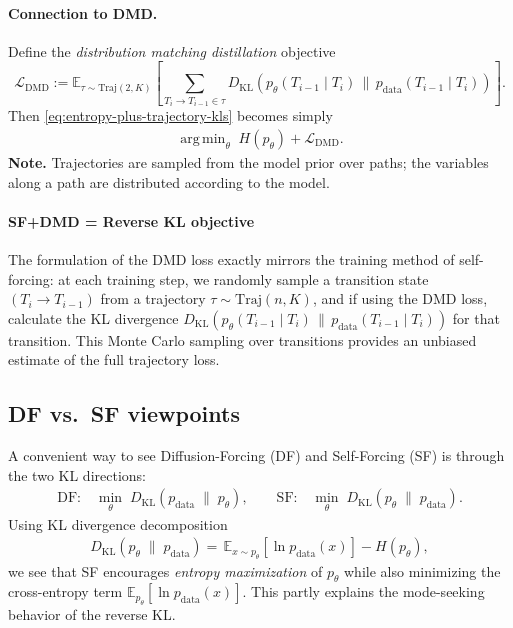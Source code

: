 \documentclass[11pt]{article}
\DeclareMathOperator*{\argmin}{arg\,min}
\begin{document}
\paragraph{Connection to DMD.}
Define the \emph{distribution matching distillation} objective
\[
\mathcal L_{\mathrm{DMD}}
:=\mathbb{E}_{\tau\sim\mathrm{Traj}(2,K)}
\left[
\sum_{T_i \rightarrow T_{i-1} \in \tau}
D_{\mathrm{KL}}\!\left(
p_\theta(T_{i-1}\mid T_i)\,\big\|\,p_{\text{data}}(T_{i-1}\mid T_i)
\right)
\right].
\]
Then \eqref{eq:entropy-plus-trajectory-kls} becomes simply
\begin{align}
\argmin_\theta\; H\!\left(p_\theta\right)+\mathcal L_{\mathrm{DMD}}.
\end{align}
\textbf{Note.} Trajectories are sampled from the model prior over paths; the
variables along a path are distributed according to the model.

\paragraph{SF+DMD = Reverse KL objective}
The formulation of the DMD loss exactly mirrors the training method of self-forcing: at each training step, we randomly sample a transition state $(T_i \rightarrow T_{i-1})$ from a trajectory $\tau \sim \mathrm{Traj}(n,K)$, and if using the DMD loss, calculate the KL divergence $D_{\mathrm{KL}}\!\left(p_\theta(T_{i-1}\mid T_i)\,\big\|\,p_{\text{data}}(T_{i-1}\mid T_i)\right)$ for that transition. This Monte Carlo sampling over transitions provides an unbiased estimate of the full trajectory loss.



\subsection*{DF vs.\ SF viewpoints}

A convenient way to see Diffusion-Forcing (DF) and Self-Forcing (SF) is
through the two KL directions:
\begin{align}
\text{DF:}\quad
\min_\theta\;D_{\mathrm{KL}}\!\left(p_{\text{data}}\;\big\|\;p_\theta\right),
\qquad
\text{SF:}\quad
\min_\theta\;D_{\mathrm{KL}}\!\left(p_\theta\;\big\|\;p_{\text{data}}\right).
\end{align}
Using KL divergence decomposition
\begin{align}
D_{\mathrm{KL}}\!\left(p_\theta\;\big\|\;p_{\text{data}}\right)
= \,\mathbb{E}_{x\sim p_\theta}\!\left[\ln p_{\text{data}}(x)\right]
- H\!\left(p_\theta\right),
\label{eq:rkl-entropy}
\end{align}
we see that SF encourages \emph{entropy maximization} of $p_\theta$ while
also minimizing the cross-entropy term $\mathbb{E}_{p_\theta}[\ln
p_{\text{data}}(x)]$. This partly explains the mode-seeking behavior of the
reverse KL.
\end{document}
